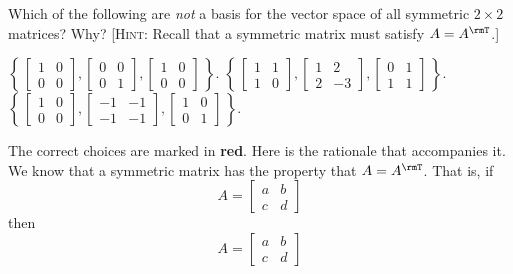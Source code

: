 \begin{questions}
  \question Which of the following are \emph{not} a basis for the vector
  space of all symmetric $2\times 2$ matrices? Why? [\textsc{Hint}: Recall
  that a symmetric matrix must satisfy $A=A^\rmT$.]
  \begin{choices}
    \choice%
    $\displaystyle\left\{\,%
      \begin{bmatrix}1&0\\0&0\end{bmatrix},%
      \begin{bmatrix}0&0\\0&1\end{bmatrix},
      \begin{bmatrix}1&0\\0&0\end{bmatrix}%
      \,\right\}$.%
    \CorrectChoice%
    $\displaystyle\left\{\,%
      \begin{bmatrix}1&1\\1&0\end{bmatrix},
      \begin{bmatrix}1&2\\2&-3\end{bmatrix},
      \begin{bmatrix}0&1\\1&1\end{bmatrix}%
      \,\right\}$.%
    \CorrectChoice%
    $\displaystyle\left\{\,
      \begin{bmatrix}1&0\\0&0\end{bmatrix},
      \begin{bmatrix}-1&-1\\-1&-1\end{bmatrix},%
      \begin{bmatrix}1&0\\0&1\end{bmatrix}%
      \,\right\}$.%
  \end{choices}
  \begin{solution}
    The correct choices are marked in
    {\color{Red!85!black}\textbf{red}}. Here is the rationale that
    accompanies it. We know that a symmetric matrix has the property that
    $A=A^\rmT$. That is, if
    \[
      A=\begin{bmatrix} a&b\\c&d
      \end{bmatrix}
    \]
    then
    \[
      A=
      \begin{bmatrix}
        a&b\\c&d

\end{bmatrix}\]
\end{solution}
\end{questions}
